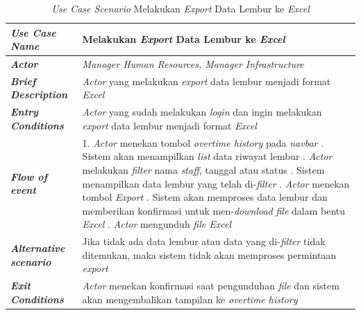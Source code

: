 \FloatBarrier
\begin{longtable}{ |p{6cm}|p{8cm}|}
\caption{\textit{Use Case Scenario} Melakukan \textit{Export} Data Lembur ke \textit{Excel}}\label{tab:use-case-scenario-melakukan-export-data-lembur} 
\\
\hline
\textbf{\textit{Use Case Name}}
&Melakukan \textit{Export} Data Lembur ke \textit{Excel}
\\ \hline

\textbf{\textit{Actor}}
&\textit{Manager Human Resources, Manager Infrastructure}
\\ \hline

\textbf{\textit{Brief Description}}
&\textit{Actor} yang melakukan \textit{export} data lembur menjadi format \textit{Excel}
\\ \hline

\textbf{\textit{Entry Conditions}}
&\textit{Actor} yang sudah melakukan \textit{login} dan ingin melakukan \textit{export} data lembur menjadi format \textit{Excel}
\\ \hline

\textbf{\textit{Flow of event}}
&1. \textit{Actor} menekan tombol \textit{overtime history} pada \textit{navbar}
\newline
2. Sistem akan menampilkan \textit{list} data riwayat lembur
\newline
3. \textit{Actor} melakukan \textit{filter} nama \textit{staff}, tanggal atau status
\newline
4. Sistem menampilkan data lembur yang telah di-\textit{filter}
\newline
5. \textit{Actor} menekan tombol \textit{Export}
\newline
6. Sistem akan memproses data lembur dan memberikan konfirmasi untuk men-\textit{download} \textit{file} dalam bentu \textit{Excel}
\newline
7. \textit{Actor} mengunduh \textit{file Excel}
\newline
\\ \hline

\textbf{\textit{Alternative scenario}}
&Jika tidak ada data lembur atau data yang di-\textit{filter} tidak ditemukan, maka sistem tidak akan memproses permintaan \textit{export}
\\ \hline

\textbf{\textit{Exit Conditions}}
&\textit{Actor} menekan konfirmasi saat pengunduhan \textit{file} dan sistem akan mengembalikan tampilan ke \textit{overtime history}
\\ \hline
\end{longtable}

